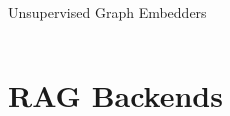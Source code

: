 \documentclass[aspectratio=169,10pt]{beamer}
\begin{document}
\begin{frame}{Unsupervised Graph Embedders}
\begin{columns}[T]
\end{columns}
\end{frame}

\section{RAG Backends}
\end{document}
